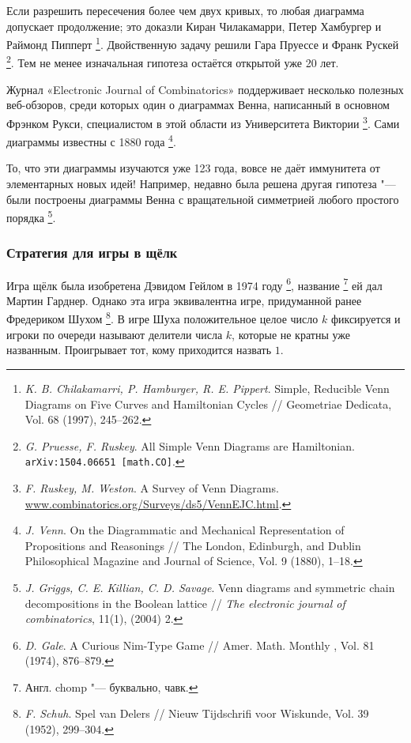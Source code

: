 \documentclass[twoside]{book}
\begin{document}
Если разрешить пересечения более чем двух кривых, то любая диаграмма допускает продолжение; это доказли Киран Чилакамарри, Петер Хамбургер и Раймонд Пипперт%
\footnote{\emph{K. B. Chilakamarri, P. Hamburger, R. E. Pippert}.
Simple, Reducible Venn Diagrams on Five Curves and Hamiltonian Cycles /\!/ {Geometriae Dedicata}, Vol. 68 (1997), 245--262.}.
Двойственную задачу решили Гара Пруессе и Франк Рускей%
\footnote{\emph{G. Pruesse, F. Ruskey}.
All Simple Venn Diagrams are Hamiltonian.
\texttt{arXiv:1504.06651 [math.CO]}.}.
Тем не менее изначальная гипотеза остаётся открытой уже 20 лет.

Журнал «Electronic Journal of Combinatorics» поддерживает не\-сколь\-ко полезных веб-обзоров, среди которых один о диаграммах Венна, написанный в основном Фрэнком Рукси, специалистом в этой области из Университета Виктории%
\footnote{\emph{F. Ruskey, M. Weston}. {A Survey of Venn Diagrams}. \href{http://www.combinatorics.org/Surveys/ds5/VennEJC.html}{\url{www.combinatorics.org/Surveys/ds5/VennEJC.html}}.}.
Сами диаграммы известны с 1880 года%
\footnote{\emph{J. Venn}.
On the Diagrammatic and Mechanical Representation of Propositions and Reasonings /\!/ {The London, Edinburgh, and Dublin Philosophical Magazine and Journal of Science}, Vol. 9 (1880),  1--18.}.



То, что эти диаграммы изучаются уже 123 года, вовсе не даёт иммунитета от элементарных новых идей!
Например, недавно была решена другая гипотеза "--- были построены диаграммы Венна с вращательной симметрией любого простого порядка%
\footnote{\emph{J. Griggs, C. E. Killian, C. D. Savage}. Venn diagrams and symmetric chain decom\-po\-si\-tions in the Boolean lattice /\!/
\emph{The electronic journal of combinatorics}, 11(1), (2004) 2.}.

\subsubsection*{Стратегия для игры в щёлк}

Игра щёлк была изобретена Дэвидом Гейлом в 1974 году%
\footnote{\emph{D. Gale}. A Curious Nim-Type Game /\!/ {Amer. Math. Monthly }, Vol. 81 (1974), 876--879.},
 название%
\footnote{Англ. chomp "--- буквально, чавк.}
 ей дал Мартин Гарднер.
Однако эта игра эквивалентна игре, придуманной ранее Фредериком Шухом%
\footnote{\emph{F. Schuh}. Spel van Delers /\!/ {Nieuw Tijdschrifi voor Wiskunde}, Vol. 39 (1952), 299--304.}.
В игре Шуха положительное целое число $k$ фиксируется и игроки по очереди называют делители числа $k$, которые не кратны уже названным.
Проигрывает тот, кому приходится назвать $1$.
\end{document}
